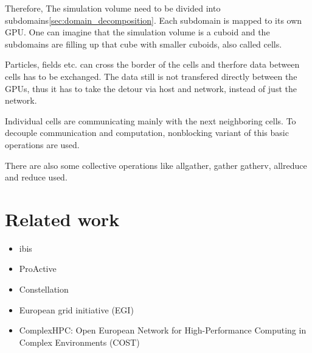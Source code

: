 Therefore, The simulation volume need to be divided into
subdomains\ref{sec:domain_decomposition}. Each subdomain is mapped to
its own GPU. One can imagine that the simulation volume is a cuboid
and the subdomains are filling up that cube with smaller cuboids,
also called cells.

Particles, fields etc. can cross the border of the
cells and therfore data between cells has to be
exchanged. The data still is not transfered directly between 
the GPUs, thus it has to take the detour via host and network, instead
of just the network.

Individual cells are communicating mainly with the next
neighboring cells. To decouple communication and computation,
nonblocking variant of this basic operations are used.

 There are also some
collective operations like allgather, gather gatherv, allreduce and
reduce used.


\section{Related work}

\begin{itemize}
  \item ibis
  \item ProActive
  \item Constellation
  \item European grid initiative (EGI)
  \item ComplexHPC: Open European Network for High-Performance Computing in Complex Environments (COST)
\end{itemize}


\cleardoublepage


